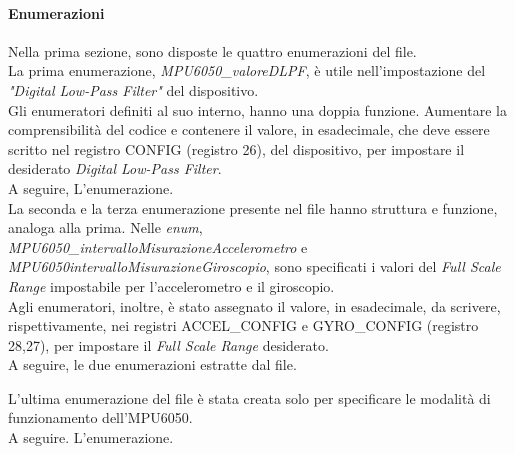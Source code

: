 \paragraph{Enumerazioni}
Nella prima sezione, sono disposte le quattro enumerazioni del file.\\
La prima enumerazione, \textit{MPU6050\_valoreDLPF}, è utile nell'impostazione del \textit{"Digital Low-Pass Filter"} del dispositivo.\\
Gli enumeratori definiti al suo interno, hanno una doppia funzione. Aumentare la comprensibilità del codice e contenere
il valore, in esadecimale, che deve essere scritto nel registro CONFIG (registro 26), del dispositivo, per impostare il desiderato \textit{Digital Low-Pass Filter}.\\
A seguire, L'enumerazione.\\

La seconda e la terza enumerazione presente nel file hanno struttura e funzione, analoga alla prima.
Nelle \textit{enum},\\ \textit{MPU6050\_intervalloMisurazioneAccelerometro} e \textit{MPU6050intervalloMisurazioneGiroscopio}, sono specificati i valori del \textit{Full Scale Range} impostabile per l'accelerometro e il giroscopio.\\
Agli enumeratori, inoltre, è stato assegnato il valore, in esadecimale, da scrivere, rispettivamente, nei registri ACCEL\_CONFIG e GYRO\_CONFIG (registro 28,27), per impostare il \textit{Full Scale Range} desiderato.\\
A seguire, le due enumerazioni estratte dal file.
\newpage

L'ultima enumerazione del file è stata creata solo per specificare le modalità di funzionamento dell'MPU6050.\\
A seguire. L'enumerazione.\\



